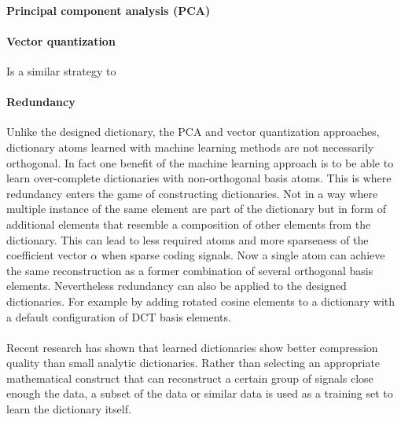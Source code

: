 \paragraph{Principal component analysis (PCA)} 

\paragraph{Vector quantization} Is a similar strategy to


\paragraph{Redundancy} Unlike the designed dictionary, the PCA and
vector quantization approaches, dictionary atoms learned with machine learning
methods are not necessarily orthogonal. In fact one benefit of the machine
learning approach is to be able to learn over-complete dictionaries with
non-orthogonal basis atoms. This is where redundancy enters the game of
constructing dictionaries. Not in a way where multiple instance of the same
element are part of the dictionary but in form of additional elements that
resemble a composition of other elements from the dictionary. This can lead to
less required atoms and more sparseness of the coefficient vector $\alpha$ when
sparse coding signals. Now a single atom can achieve the same reconstruction as
a former combination of several orthogonal basis elements. Nevertheless
redundancy can also be applied to the designed dictionaries. For example by
adding rotated cosine elements to a dictionary with a default configuration of
DCT basis elements.


\paragraph{}
Recent research\cite{Chen1998,Aharon2006,Mairal2010} has shown that learned
dictionaries show better compression quality than small analytic
dictionaries. Rather than selecting an appropriate mathematical construct that
can reconstruct a certain group of signals close enough the data, a subset of
the data or similar data is used as a training set to learn the dictionary
itself.



